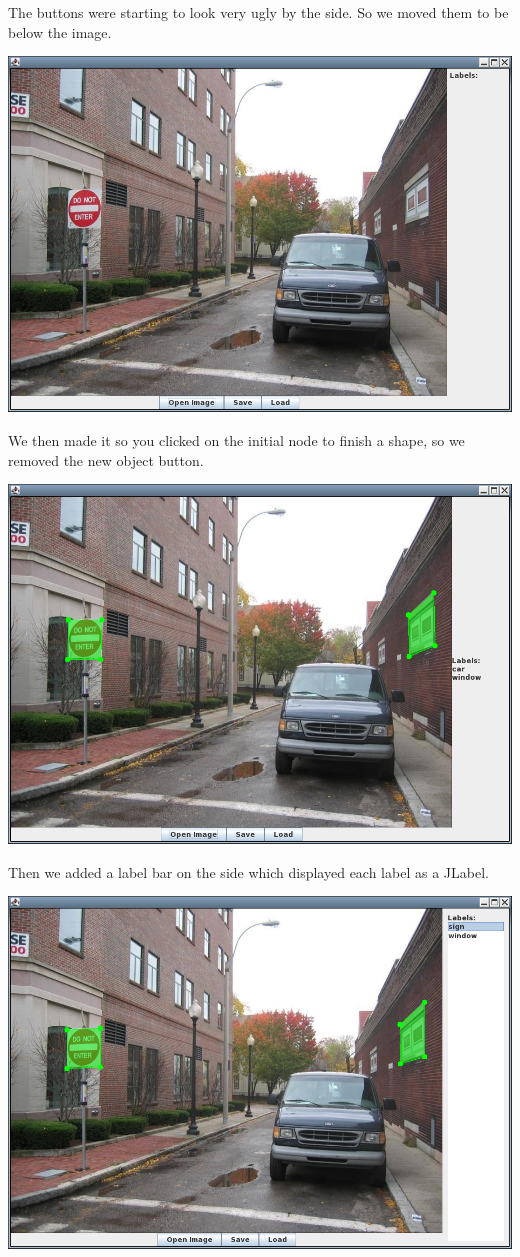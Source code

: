 \documentclass[a4paper,11pt,oneside]{article}
\begin{document}
The buttons were starting to look very ugly by the side.  So we moved them to
be below the image.

\includegraphics[width=\textwidth]{old4.png}

We then made it so you clicked on the initial node to finish a shape, so we
removed the new object button.

\includegraphics[width=\textwidth]{old5.png}

Then we added a label bar on the side which displayed each label as a JLabel.

\includegraphics[width=\textwidth]{old6.png}
\end{document}
